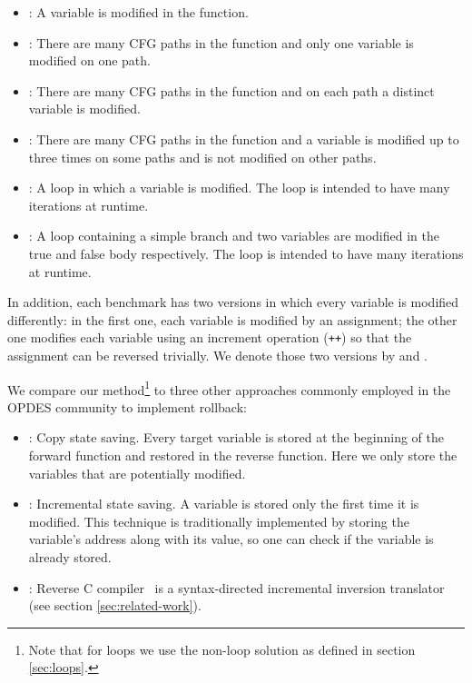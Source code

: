 \begin{itemize}

\item \NoBranch: A variable is modified in the function.



\item \Branchesa: There are many CFG paths in the function and only one variable is modified on one path.

\item \Branchesb: There are many CFG paths in the function and on each path a distinct variable is modified.

\item \Branchesc: There are many CFG paths in the function and a variable is modified up to three times on some paths and is not modified on other paths.


\item \Loopa: A loop in which a variable is modified. The loop is intended to have many iterations at runtime.
\item \Loopb: A loop containing a simple branch and two variables are modified in the true and false body respectively. The loop is intended to have many iterations at runtime.


\end{itemize}

In addition, each benchmark has two versions in which every variable is modified differently: in the first one, each variable is modified by an assignment; the other one modifies each variable using an increment operation (\texttt{++}) so that the assignment can be reversed trivially. 
We denote those two versions by \Asn and \Inc. 

We compare our method\footnote{Note that for loops we use the non-loop solution as defined in section \ref{sec:loops}.} to three other approaches commonly employed in the OPDES community to implement rollback:

\begin{itemize}
\item \CSS: Copy state saving. Every target variable is stored at the beginning of the forward function and restored in the reverse function. Here we only store the variables that are potentially modified.
\item \ISS: Incremental state saving. A variable is stored only the first time it is modified. 
This technique is traditionally implemented by storing the variable's address along with its value, so one can check if the variable is already stored.

\item \RCC: Reverse C compiler~\cite{Carothers1999} is a syntax-directed incremental inversion translator (see section \ref{sec:related-work}). 
\end{itemize}

